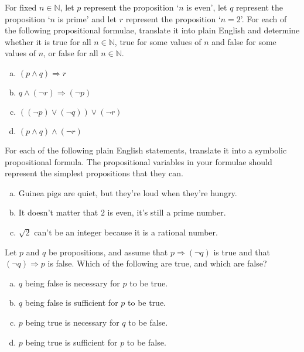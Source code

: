 \begin{chapex}
\label{cqTranslatePropositionalFormulaeToEnglish}
For fixed $n \in \mathbb{N}$, let $p$ represent the proposition `$n$ is even', let $q$ represent the proposition `$n$ is prime' and let $r$ represent the proposition `$n = 2$'. For each of the following propositional formulae, translate it into plain English and determine whether it is true for all $n \in \mathbb{N}$, true for some values of $n$ and false for some values of $n$, or false for all $n \in \mathbb{N}$.

\begin{enumerate}[(a)]
\item $(p \wedge q) \Rightarrow r$
\item $q \wedge (\neg r) \Rightarrow (\neg p)$
\item $((\neg p) \vee (\neg q)) \vee (\neg r)$
\item $(p \wedge q) \wedge (\neg r)$
\end{enumerate}
\end{chapex}

\begin{chapex}
For each of the following plain English statements, translate it into a symbolic propositional formula. The propositional variables in your formulae should represent the simplest propositions that they can.
\begin{enumerate}[(a)]
\item Guinea pigs are quiet, but they're loud when they're hungry.
\item It doesn't matter that $2$ is even, it's still a prime number.
\item $\sqrt{2}$ can't be an integer because it is a rational number.
\end{enumerate}
\end{chapex}

\begin{chapex}
Let $p$ and $q$ be propositions, and assume that $p \Rightarrow (\neg q)$ is true and that $(\neg q) \Rightarrow p$ is false. Which of the following are true, and which are false?
\begin{enumerate}[(a)]
\item $q$ being false is necessary for $p$ to be true.
\item $q$ being false is sufficient for $p$ to be true.
\item $p$ being true is necessary for $q$ to be false.
\item $p$ being true is sufficient for $p$ to be false.
\end{enumerate}
\end{chapex}

